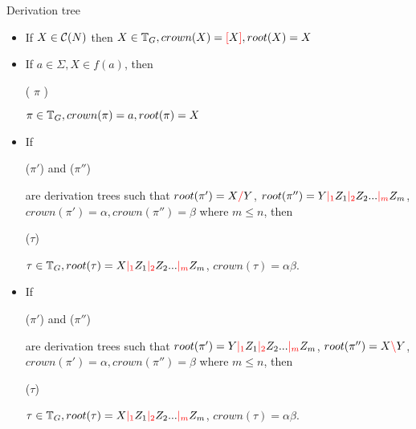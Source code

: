 \documentclass[main.tex]{subfiles}
\begin{document}
\begin{defn}
    Derivation tree
    \begin{itemize}
        \item If $ X \in \mathcal{C}( N ) $ then $ X \in \mathbb{T}_{ G }, crown(X) = \textcolor{red}{[} X \textcolor{red}{]}, root(X) = X$
        \item If $ a \in \Sigma, X \in f(a) $, then
            \begin{center}
                 ( $ \pi $ )
            \end{center}
            $ \pi \in \mathbb{T}_{ G }, crown(\pi) = a, root(\pi) = X$
        \item If
            \begin{center}
                 ($\pi'$)
                \quad and \quad
                 ($\pi''$)
            \end{center}

            are derivation trees such that $ root(\pi') = X \textcolor{red}{/} Y $,
            $ root(\pi'') = Y \textcolor{red}{|_{1}} Z_1 \textcolor{red}{|_{2}} Z_2 ... \textcolor{red}{|_{m}} Z_m $,
            $ crown(\pi') = \alpha, crown(\pi'') = \beta $
            where $m \leq n$, then
            \begin{center}
                 ($\tau$)
            \end{center}
            $ \tau \in \mathbb{T}_{ G }, root(\tau) = X \textcolor{red}{|_{1}} Z_1 \textcolor{red}{|_{2}} Z_2 ... \textcolor{red}{|_{m}} Z_m $,
            $ crown(\tau) = \alpha \beta$.
        \item If
            \begin{center}
                 ($\pi'$)
                \quad and \quad
                 ($\pi''$)
            \end{center}
            are derivation trees such that
            $ root(\pi') = Y \textcolor{red}{|_{1}} Z_1 \textcolor{red}{|_{2}} Z_2 ... \textcolor{red}{|_{m}} Z_m $,
            $ root(\pi'') = X \textcolor{red}{\backslash} Y $,
            $ crown(\pi') = \alpha, crown(\pi'') = \beta $
            where $m \leq n$, then
            \begin{center}
                 ($\tau$)
            \end{center}
            $ \tau \in \mathbb{T}_{ G }, root(\tau) = X \textcolor{red}{|_{1}} Z_1 \textcolor{red}{|_{2}} Z_2 ... \textcolor{red}{|_{m}} Z_m $,
            $ crown(\tau) = \alpha \beta $.
    \end{itemize}
\end{defn}
\end{document}
